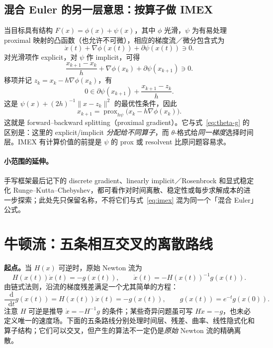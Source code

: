 \documentclass[11pt,a4paper]{ctexart}
\newcommand{\dd}{\mathop{}\!\mathrm d}
\newcommand{\prox}{\operatorname{prox}}
\begin{document}
\subsection{混合 Euler 的另一层意思：按算子做 IMEX}
当目标具有结构 $F(x)=\phi(x)+\psi(x)$，其中 $\phi$ 光滑，$\psi$ 为有易处理 proximal 映射的凸函数（也允许不可微），相应的梯度流／微分包含式为
\begin{equation}\label{eq:composite-flow}
\dot x(t)+\nabla\phi(x(t))+\partial\psi(x(t))\ni0.
\end{equation}
对光滑项作 explicit，对 $\psi$ 作 implicit，可得
\begin{equation}\label{eq:imex}
\frac{x_{k+1}-x_k}{h}+\nabla\phi(x_k)+\partial\psi(x_{k+1})\ni0.
\end{equation}
移项并记 $z_k=x_k-h\nabla\phi(x_k)$，有
\[
0\in\partial\psi(x_{k+1})+\frac{x_{k+1}-z_k}{h}.
\]
这是 $\psi(x)+(2h)^{-1}\|x-z_k\|^2$ 的最优性条件，因此
\begin{equation}\label{eq:pg}
x_{k+1}=\prox_{h\psi}\bigl(x_k-h\nabla\phi(x_k)\bigr).
\end{equation}
这就是 forward--backward splitting（proximal gradient）。它与式~\eqref{eq:theta-g} 的区别是：这里的 explicit/implicit \emph{分配给不同算子}，而 $\theta$-格式给\emph{同一梯度}选择时间层。IMEX 有计算价值的前提是 $\psi$ 的 prox 或 resolvent 比原问题容易求。

\paragraph{小范围的延伸。}手写框架最后记下的 discrete gradient、linearly implicit／Rosenbrock 和显式稳定化 Runge--Kutta--Chebyshev，都可看作对时间离散、稳定性或每步求解成本的进一步探索；此处先只保留名称，不将它们与式~\eqref{eq:imex} 混为同一个「混合 Euler」公式。

\section{牛顿流：五条相互交叉的离散路线}

\noindent\textbf{起点。}当 $H(x)$ 可逆时，原始 Newton 流为
\begin{equation}\label{eq:nf}
H(x(t))\dot x(t)=-g(x(t)),
\qquad \dot x(t)=-H(x(t))^{-1}g(x(t)).
\end{equation}
由链式法则，沿流的梯度残差满足一个尤其简单的方程：
\begin{equation}\label{eq:res-ode}
\frac{\dd}{\dd t}g(x(t))=H(x(t))\dot x(t)=-g(x(t)),
\qquad g(x(t))=e^{-t}g(x(0)).
\end{equation}
注意 $H$ 可逆是推导 $\dot x=-H^{-1}g$ 的条件；某些奇异问题虽可写 $H\dot x=-g$，也未必定义唯一的速度场。下面的五条路线分别处理时间层、残差、曲率、线性隐式化和算子结构；它们可以交叉，但产生的算法不一定仍是\emph{原始} Newton 流的精确离散。
\end{document}
